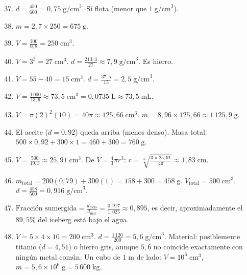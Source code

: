 \documentclass[12pt, letterpaper]{article}
\begin{document}
  \begin{enumerate}[leftmargin=*, label=\textbf{\arabic*.}]
    \setcounter{enumi}{36}
    \item $d = \frac{450}{600} = 0{,}75\;\text{g/cm}^3$. Sí flota (menor que $1\;\text{g/cm}^3$).

    \item $m = 2{,}7 \times 250 = 675\;\text{g}$.

    \item $V = \frac{200}{0{,}8} = 250\;\text{cm}^3$.

    \item $V = 3^3 = 27\;\text{cm}^3$. $d = \frac{213{,}3}{27} \approx 7{,}9\;\text{g/cm}^3$. Es hierro.

    \item $V = 55 - 40 = 15\;\text{cm}^3$. $d = \frac{37{,}5}{15} = 2{,}5\;\text{g/cm}^3$.

    \item $V = \frac{1\,000}{13{,}6} \approx 73{,}5\;\text{cm}^3 = 0{,}0735\;\text{L} \approx 73{,}5\;\text{mL}$.

    \item $V = \pi(2)^2(10) = 40\pi \approx 125{,}66\;\text{cm}^3$. $m = 8{,}96 \times 125{,}66 \approx 1\,125{,}9\;\text{g}$.

    \item El aceite ($d = 0{,}92$) queda arriba (menos denso). Masa total: $500 \times 0{,}92 + 300 \times 1 = 460 + 300 = 760\;\text{g}$.

    \item $V = \frac{500}{19{,}3} \approx 25{,}91\;\text{cm}^3$. De $V = \frac{4}{3}\pi r^3$: $r = \sqrt[3]{\frac{3 \times 25{,}91}{4\pi}} \approx 1{,}83\;\text{cm}$.

    \item $m_{\text{total}} = 200(0{,}79) + 300(1) = 158 + 300 = 458\;\text{g}$. $V_{\text{total}} = 500\;\text{cm}^3$. $d = \frac{458}{500} = 0{,}916\;\text{g/cm}^3$.

    \item $\text{Fracción sumergida} = \frac{d_{\text{hielo}}}{d_{\text{mar}}} = \frac{0{,}917}{1{,}025} \approx 0{,}895$, es decir, aproximadamente el $89{,}5\%$ del iceberg está bajo el agua.

    \item $V = 5 \times 4 \times 10 = 200\;\text{cm}^3$. $d = \frac{1\,120}{200} = 5{,}6\;\text{g/cm}^3$. Material: posiblemente titanio ($d = 4{,}51$) o hierro gris, aunque $5{,}6$ no coincide exactamente con ningún metal común. Un cubo de $1\;\text{m}$ de lado: $V = 10^6\;\text{cm}^3$, $m = 5{,}6 \times 10^6\;\text{g} = 5\,600\;\text{kg}$.
  \end{enumerate}

\fi
\end{document}
